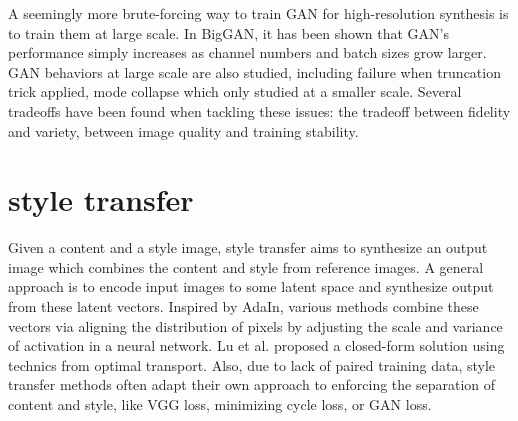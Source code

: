\documentclass{article}
\begin{document}
A seemingly more brute-forcing way to train GAN for high-resolution synthesis is to train them at large scale. In BigGAN\cite{brock2018large}, it has been shown that GAN's performance simply increases as channel numbers and batch sizes grow larger. GAN behaviors at large scale are also studied, including failure when truncation trick applied, mode collapse which only studied at a smaller scale. Several tradeoffs have been found when tackling these issues: the tradeoff between fidelity and variety, between image quality and training stability.

\section{style transfer}

Given a content and a style image, style transfer aims to synthesize an output image which combines the content and style from reference images. A general approach\cite{zheng2019joint, BeautyGlow, Li2018BeautyGANIF, Wu2019DisentanglingCA} is to encode input images to some latent space and synthesize output from these latent vectors. Inspired by AdaIn\cite{huang2017adain}, various methods\cite{zhu2019sean, park2019SPADE} combine these vectors via aligning the distribution of pixels by adjusting the scale and variance of activation in a neural network. Lu et al.\cite{Lu2019ACS} proposed a closed-form solution using technics from optimal transport. Also, due to lack of paired training data, style transfer methods often adapt their own approach to enforcing the separation of content and style, like VGG loss\cite{7780634}, minimizing cycle loss\cite{Lu2017ConditionalCF}, or GAN loss\cite{pix2pixSC2019, ma2017pose}.





\end{document}
